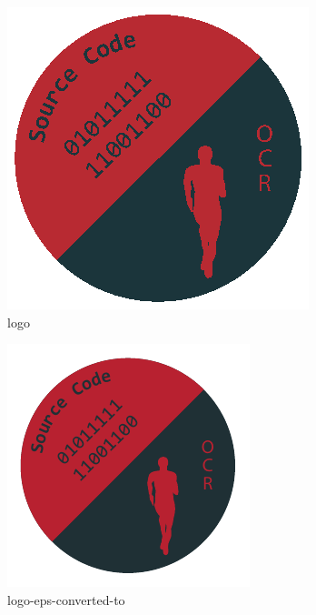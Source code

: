 %
%
\begin{figure}[!hb]%
    \centering
  \includegraphics[width=.80\textwidth]{Grafiken/logo.eps}%
  \caption{logo}%
\end{figure}

%
%
\begin{figure}[!hb]%
    \centering
  \includegraphics[width=.80\textwidth]{Grafiken/logo-eps-converted-to.pdf}%
  \caption{logo-eps-converted-to}%
\end{figure}

